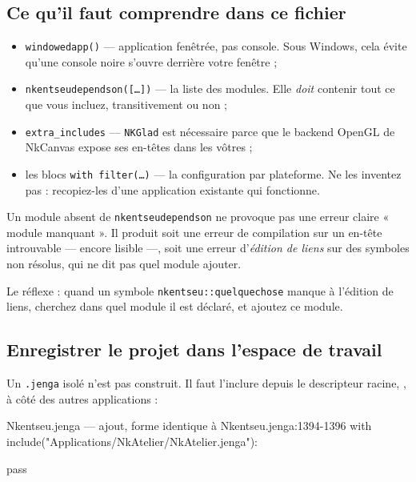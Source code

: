\subsection{Ce qu'il faut comprendre dans ce fichier}

\begin{itemize}
  \item \texttt{windowedapp()} — application fenêtrée, pas console. Sous Windows,
        cela évite qu'une console noire s'ouvre derrière votre fenêtre ;
  \item \texttt{nkentseudependson([\dots])} — la liste des modules. Elle
        \emph{doit} contenir tout ce que vous incluez, transitivement ou non ;
  \item \texttt{extra\_includes} — \texttt{NKGlad} est nécessaire parce que le
        backend OpenGL de NkCanvas expose ses en-têtes dans les vôtres ;
  \item les blocs \texttt{with filter(\dots)} — la configuration par plateforme.
        Ne les inventez pas : recopiez-les d'une application existante qui
        fonctionne.
\end{itemize}

\begin{nkpiege}
Un module absent de \texttt{nkentseudependson} ne provoque pas une erreur claire
« module manquant ». Il produit soit une erreur de compilation sur un en-tête
introuvable — encore lisible —, soit une erreur d'\emph{édition de liens} sur des
symboles non résolus, qui ne dit pas quel module ajouter.

Le réflexe : quand un symbole \texttt{nkentseu::quelquechose} manque à l'édition
de liens, cherchez dans quel module il est déclaré, et ajoutez ce module.
\end{nkpiege}

\subsection{Enregistrer le projet dans l'espace de travail}

Un \texttt{.jenga} isolé n'est pas construit. Il faut l'inclure depuis le
descripteur racine, , à côté des autres applications :

\begin{nkcode}{Nkentseu.jenga — ajout, forme identique à Nkentseu.jenga:1394-1396}
    with include("Applications/NkAtelier/NkAtelier.jenga"):

        pass
\end{nkcode}

